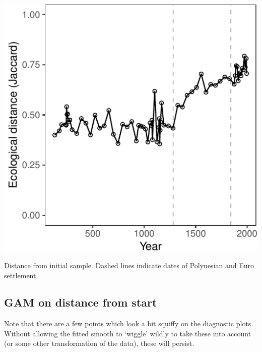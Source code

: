 \documentclass[nofonts,]{tufte-handout}
\newenvironment{Shaded}{\begin{snugshade}}{\end{snugshade}}
\newcommand{\AttributeTok}[1]{\textcolor[rgb]{0.13,0.29,0.53}{#1}}
\newcommand{\DecValTok}[1]{\textcolor[rgb]{0.00,0.00,0.81}{#1}}
\newcommand{\FunctionTok}[1]{\textcolor[rgb]{0.13,0.29,0.53}{\textbf{#1}}}
\newcommand{\NormalTok}[1]{#1}
\newcommand{\OtherTok}[1]{\textcolor[rgb]{0.56,0.35,0.01}{#1}}
\newcommand{\SpecialCharTok}[1]{\textcolor[rgb]{0.81,0.36,0.00}{\textbf{#1}}}
\newcommand{\StringTok}[1]{\textcolor[rgb]{0.31,0.60,0.02}{#1}}
\begin{document}
\begin{marginfigure}
\includegraphics{Technical-supplement_files/figure-latex/distStartRaw-1} \caption[Distance from initial sample]{Distance from initial sample. Dashed lines indicate dates of Polynesian and Euro settlement}\label{fig:distStartRaw}
\end{marginfigure}

\hypertarget{gam-on-distance-from-start}{%
\subsection{GAM on distance from
start}\label{gam-on-distance-from-start}}

Note that there are a few points which look a bit squiffy on the
diagnostic plots. Without allowing the fitted smooth to `wiggle' wildly
to take these into account (or some other transformation of the data),
these will persist.

\begin{Shaded}
\end{Shaded}
\end{document}

